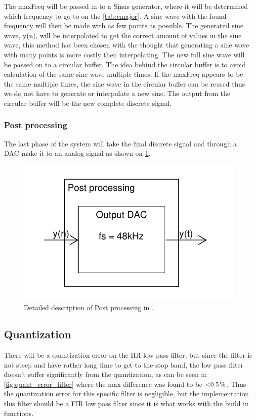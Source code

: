 The maxFreq will be passed in to a Sinus generator, where it will be determined which frequency to go to on the \cref{tab:cmajor}.
A sine wave with the found frequency will then be made with as few points as possible.
The generated sine wave, y(n), will be interpolated to get the correct amount of values in the sine wave, this method has been chosen with the thought that generating a sine wave with many points is more costly then interpolating.
The new full sine wave will be passed on to a circular buffer.
The idea behind the circular buffer is to avoid calculation of the same sine wave multiple times.
If the maxFreq appears to be the same multiple times, the sine wave in the circular buffer can be reused thus we do not have to generate or interpolate a new sine.
The output from the circular buffer will be the new complete discrete signal.

\subsubsection{Post processing}
The last phase of the system will take the final discrete signal and through a DAC make it to an analog signal as shown on \cref{fig:DetailedPostPro}.
\begin{figure}
	\centering
	\includegraphics[width=1\linewidth]{gfx/Design/DesignPostPro_IF.pdf}
	\caption{Detailed description of Post processing in \systemName.}
	\label{fig:DetailedPostPro}
\end{figure}

\subsection{Quantization} 
There will be a quantization error on the IIR low pass filter, but since the filter is not steep and have rather long time to get to the stop band, the low pass filter doesn't suffer significantly from the quantization, as can be seen in \cref{fig:quant_error_filter} where the max difference was found to be $\SI{<0.5}{\%} $.
Thus the quantization error for this specific filter is negligible, but the implementation this filter should be a FIR low pass filter since it is what works with the build in functions.

